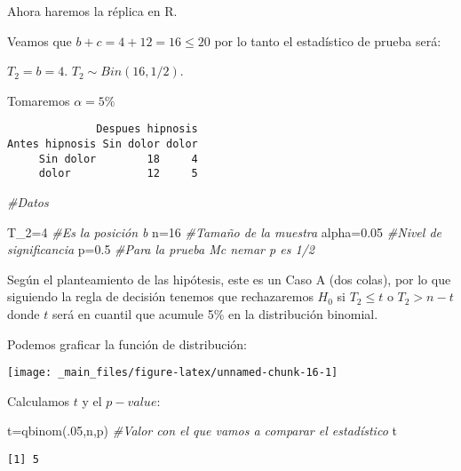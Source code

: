\documentclass[
  a4paper,
  oneside,
  openany]{book}
\newenvironment{Shaded}{\begin{snugshade}}{\end{snugshade}}
\newcommand{\CommentTok}[1]{\textcolor[rgb]{0.56,0.35,0.01}{\textit{#1}}}
\newcommand{\DecValTok}[1]{\textcolor[rgb]{0.00,0.00,0.81}{#1}}
\newcommand{\FloatTok}[1]{\textcolor[rgb]{0.00,0.00,0.81}{#1}}
\newcommand{\FunctionTok}[1]{\textcolor[rgb]{0.00,0.00,0.00}{#1}}
\newcommand{\NormalTok}[1]{#1}
\newcommand{\OtherTok}[1]{\textcolor[rgb]{0.56,0.35,0.01}{#1}}
\begin{document}
Ahora haremos la réplica en R.

Veamos que \(b+c=4+12=16\leq 20\) por lo tanto el estadístico de prueba será:

\(T_2=b=4.\)
\(T_2\sim Bin(16,1/2).\)

Tomaremos \(\alpha=5\%\)

\begin{verbatim}
              Despues hipnosis
Antes hipnosis Sin dolor dolor
     Sin dolor        18     4
     dolor            12     5
\end{verbatim}

\begin{Shaded}
\begin{Highlighting}[]
\CommentTok{\#Datos}

\NormalTok{T\_2}\OtherTok{=}\DecValTok{4}                    \CommentTok{\#Es la posición b}
\NormalTok{n}\OtherTok{=}\DecValTok{16}                     \CommentTok{\#Tamaño de la muestra}
\NormalTok{alpha}\OtherTok{=}\FloatTok{0.05}               \CommentTok{\#Nivel de significancia}
\NormalTok{p}\OtherTok{=}\FloatTok{0.5}                    \CommentTok{\#Para la prueba Mc nemar p es 1/2}
\end{Highlighting}
\end{Shaded}

Según el planteamiento de las hipótesis, este es un Caso A (dos colas), por lo que siguiendo la regla de decisión tenemos que rechazaremos \(H_0\) si \(T_2 \leq t\) o \(T_2>n-t\) donde \(t\) será en cuantil que acumule 5\% en la distribución binomial.

Podemos graficar la función de distribución:

\begin{center}\texttt{[image: \_main\_files/figure-latex/unnamed-chunk-16-1]} \end{center}

Calculamos \(t\) y el \(p-value\):

\begin{Shaded}
\begin{Highlighting}[]
\NormalTok{t}\OtherTok{=}\FunctionTok{qbinom}\NormalTok{(.}\DecValTok{05}\NormalTok{,n,p)       }\CommentTok{\#Valor con el que vamos a comparar el estadístico}
\NormalTok{t}
\end{Highlighting}
\end{Shaded}

\begin{verbatim}
[1] 5
\end{verbatim}
\end{document}
